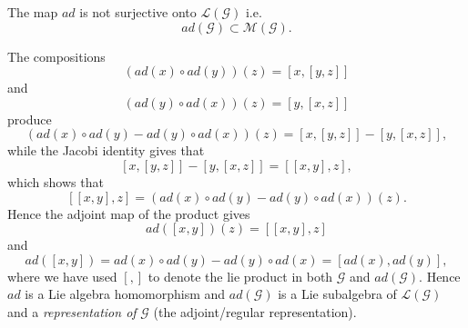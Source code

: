 \documentclass[aps,preprint]{revtex4}%
\begin{document}
The map $ad$ is not surjective onto $\mathcal{L}\left(  \mathcal{G}\right)  $
i.e.
\begin{equation}
ad\left(  \mathcal{G}\right)  \subset\mathcal{M}\left(  \mathcal{G}\right)  .
\end{equation}


The compositions
\begin{equation}
\left(  ad\left(  x\right)  \circ ad\left(  y\right)  \right)  \left(
z\right)  =\left[  x,\left[  y,z\right]  \right]
\end{equation}
and
\begin{equation}
\left(  ad\left(  y\right)  \circ ad\left(  x\right)  \right)  \left(
z\right)  =\left[  y,\left[  x,z\right]  \right]
\end{equation}
produce%
\begin{equation}
\left(  ad\left(  x\right)  \circ ad\left(  y\right)  -ad\left(  y\right)
\circ ad\left(  x\right)  \right)  \left(  z\right)  =\left[  x,\left[
y,z\right]  \right]  -\left[  y,\left[  x,z\right]  \right]  ,
\end{equation}
while the Jacobi identity gives that
\begin{equation}
\left[  x,\left[  y,z\right]  \right]  -\left[  y,\left[  x,z\right]  \right]
=\left[  \left[  x,y\right]  ,z\right]  ,
\end{equation}
which shows that
\begin{equation}
\left[  \left[  x,y\right]  ,z\right]  =\left(  ad\left(  x\right)  \circ
ad\left(  y\right)  -ad\left(  y\right)  \circ ad\left(  x\right)  \right)
\left(  z\right)  .
\end{equation}
Hence the adjoint map of the product gives
\begin{equation}
ad\left(  \left[  x,y\right]  \right)  \left(  z\right)  =\left[  \left[
x,y\right]  ,z\right]
\end{equation}
and%
\begin{equation}
ad\left(  \left[  x,y\right]  \right)  =ad\left(  x\right)  \circ ad\left(
y\right)  -ad\left(  y\right)  \circ ad\left(  x\right)  =\left[  ad\left(
x\right)  ,ad\left(  y\right)  \right]  ,
\end{equation}
where we have used $\left[  ,\right]  $ to denote the lie product in both
$\mathcal{G}$ and $ad\left(  \mathcal{G}\right)  .$ Hence $ad$ is a Lie
algebra homomorphism and $ad\left(  \mathcal{G}\right)  $ is a Lie subalgebra
of $\mathcal{L}\left(  \mathcal{G}\right)  $ and a \emph{representation of}
$\mathcal{G}$ (the adjoint/regular representation)$.$
\end{document}

